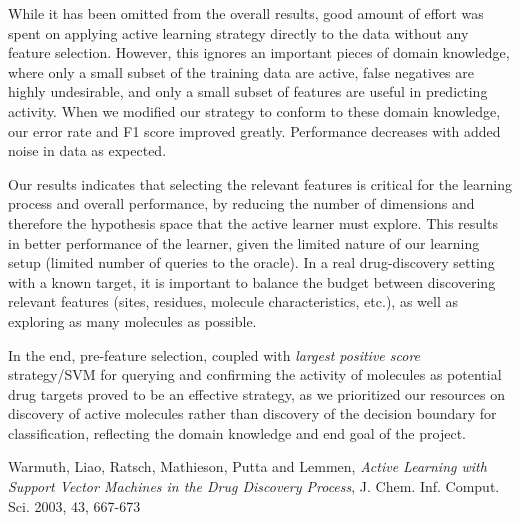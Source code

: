 \documentclass[paper=a4, fontsize=11pt]{scrartcl}
\numberwithin{equation}{section}    %
\numberwithin{figure}{section}      %
\numberwithin{table}{section}       %
\numberwithin{equation}{section}    %
\numberwithin{figure}{section}      %
\numberwithin{table}{section}       %
\begin{document}
While it has been omitted from the overall results, good amount of effort was spent on applying active learning strategy directly to the data without any feature selection. However, this ignores an important pieces of domain knowledge, where only a small subset of the training data are active, false negatives are highly undesirable, and only a small subset of features are useful in predicting activity. When we modified our strategy to conform to these domain knowledge, our error rate and F1 score improved greatly. Performance decreases with added noise in data as expected. 

Our results indicates that selecting the relevant features is critical for the learning process and overall performance, by reducing the number of dimensions and therefore the hypothesis space that the active learner must explore. This results in better performance of the learner, given the limited nature of our learning setup (limited number of queries to the oracle). In a real drug-discovery setting with a known target, it is important to balance the budget between discovering relevant features (sites, residues, molecule characteristics, etc.), as well as exploring as many molecules as possible. 

In the end, pre-feature selection, coupled with \textit{largest positive score} strategy/SVM for querying and confirming the activity of molecules as potential drug targets proved to be an effective strategy, as we prioritized our resources on discovery of active molecules rather than discovery of the decision boundary for classification, reflecting the domain knowledge and end goal of the project. 


\begin{thebibliography}{1}




Warmuth, Liao, Ratsch, Mathieson, Putta and Lemmen, \emph{Active Learning with Support Vector Machines in the Drug Discovery Process}, J. Chem. Inf. Comput. Sci. 2003, 43, 667-673

\end{thebibliography}
\end{document}
